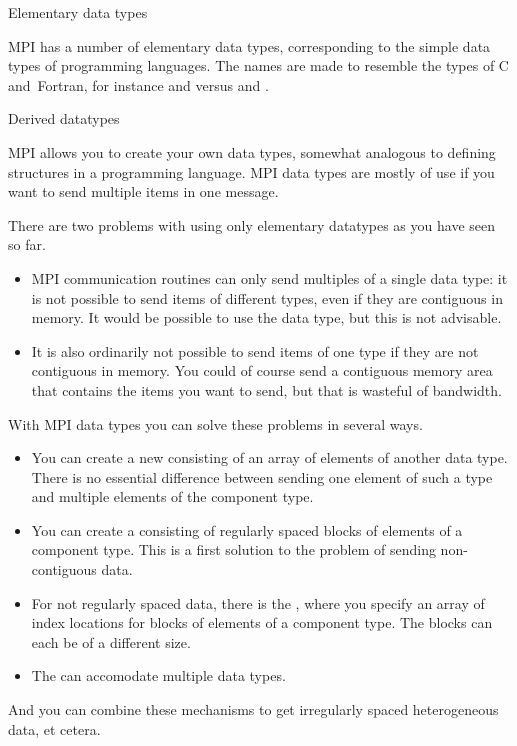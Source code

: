  {Elementary data types}

MPI has a number of elementary data types, corresponding to the 
simple data types of programming languages.
The names are made to resemble the types of C and~Fortran, 
for instance  and  versus
 and .


 {Derived datatypes}

MPI allows you to create your own data types, somewhat analogous to defining
structures in a programming language. MPI data types are mostly of use
if you want to send multiple items in one message.

There are two problems with using only elementary datatypes
as you have seen so far.
\begin{itemize}
\item MPI communication routines can only send multiples of a
  single data type: it is not possible to send items of different
  types, even if they are contiguous in memory. It would be possible
  to use the  data type, but this is not advisable.
\item It is also ordinarily not possible to send items of one type if they are
  not contiguous in memory. You could of course send a contiguous memory area
  that contains the items you want to send, but that is wasteful of
  bandwidth.
\end{itemize}
With MPI data types you can solve these problems in several ways.
\begin{itemize}
\item You can create a new 
  consisting of an array of elements of another data type. There is no
  essential difference between sending one element of such a type
  and multiple elements of the
  component type.
\item You can create a  consisting of
  regularly spaced blocks of elements of a component type. This is a first
  solution to the problem of sending non-contiguous data.
\item For not regularly spaced data, there is the
  , where you specify an array of
  index locations for blocks of elements of a component type.
  The blocks can each be of a different size.
\item The  can accomodate multiple
  data types.
\end{itemize}
And you can combine these mechanisms to get irregularly spaced
heterogeneous data, et cetera.

